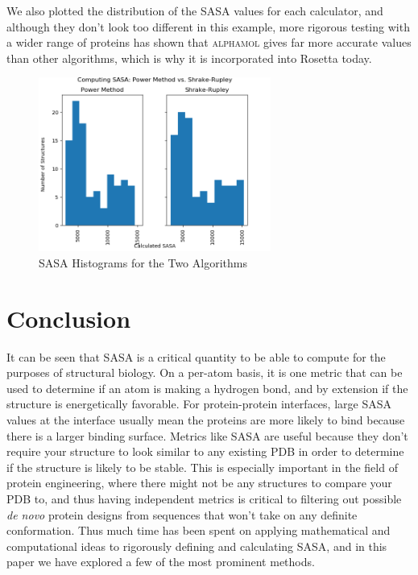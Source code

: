 \documentclass{article}
\begin{document}
We also plotted the distribution of the SASA values for each calculator, and although they don't look too different in this example, more rigorous testing with a wider range of proteins has shown that \textsc{alphamol} gives far more accurate values than other algorithms, which is why it is incorporated into Rosetta today.
\begin{figure}
\caption{SASA Histograms for the Two Algorithms}
\centerline{\includegraphics[width=3in]{sasa}}
\end{figure}

\section{Conclusion}
It can be seen that SASA is a critical quantity to be able to compute for the purposes of structural biology. On a per-atom basis, it is one metric that can be used to determine if an atom is making a hydrogen bond, and by extension if the structure is energetically favorable. For protein-protein interfaces, large SASA values at the interface usually mean the proteins are more likely to bind because there is a larger binding surface. Metrics like SASA are useful because they don't require your structure to look similar to any existing PDB in order to determine if the structure is likely to be stable. This is especially important in the field of protein engineering, where there might not be any structures to compare your PDB to, and thus having independent metrics is critical to filtering out possible \textit{de novo} protein designs from sequences that won't take on any definite conformation. Thus much time has been spent on applying mathematical and computational ideas to rigorously defining and calculating SASA, and in this paper we have explored a few of the most prominent methods.
\end{document}
